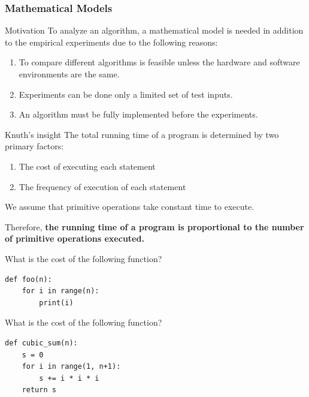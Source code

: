 \documentclass[aspectratio=169, 14pt]{beamer}
\begin{document}
\begin{frame}[fragile]
	\frametitle{Mathematical Models}
	\begin{block}{Motivation}
		To analyze an algorithm, a \alert{mathematical model} is needed in addition to the empirical experiments due to the following reasons:
	\end{block}
	\begin{enumerate}
		\item<1-> To compare different algorithms is feasible unless the hardware and software environments are the same.
		\item<2-> Experiments can be done only a limited set of test inputs.
		\item<3-> An algorithm must be fully implemented before the experiments.
	\end{enumerate}
\end{frame}

\begin{frame}

	\begin{exampleblock}{Knuth's insight}
		The total running time of a program is determined by two primary factors:
		\begin{enumerate}
			\item The cost of executing each statement
			\item The frequency of execution of each statement
		\end{enumerate}
	\end{exampleblock}

	We assume that \alert{primitive operations} take \alert{constant} time to execute.

	Therefore, \textbf{the running time of a program is proportional to the number of primitive operations executed.}

\end{frame}

\begin{frame}[fragile]

	{\large {}} What is the cost of the following function?
	\begin{verbatim}
def foo(n):
    for i in range(n):
        print(i)
\end{verbatim}

	{\large {}} What is the cost of the following function?
	\begin{verbatim}
def cubic_sum(n):
    s = 0
    for i in range(1, n+1):
        s += i * i * i
    return s
\end{verbatim}
\end{frame}
\end{document}

